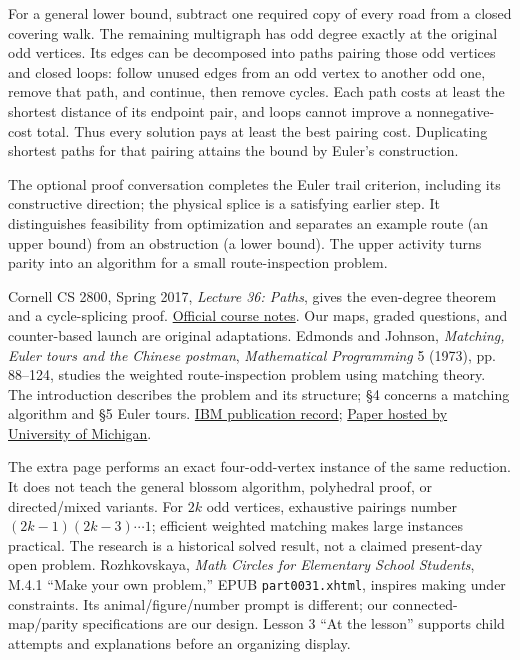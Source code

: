 \documentclass[11pt]{article}
\begin{document}
For a general lower bound, subtract one required copy of every road from a closed covering walk. The remaining multigraph has odd degree exactly at the original odd vertices. Its edges can be decomposed into paths pairing those odd vertices and closed loops: follow unused edges from an odd vertex to another odd one, remove that path, and continue, then remove cycles. Each path costs at least the shortest distance of its endpoint pair, and loops cannot improve a nonnegative-cost total. Thus every solution pays at least the best pairing cost. Duplicating shortest paths for that pairing attains the bound by Euler's construction.

\newpage

The optional proof conversation completes the Euler trail criterion, including its constructive direction; the physical splice is a satisfying earlier step. It distinguishes feasibility from optimization and separates an example route (an upper bound) from an obstruction (a lower bound). The upper activity turns parity into an algorithm for a small route-inspection problem.

Cornell CS 2800, Spring 2017, \emph{Lecture 36: Paths}, gives the even-degree theorem and a cycle-splicing proof. \href{https://www.cs.cornell.edu/courses/cs2800/2017sp/lectures/lec36-graphs2.html}{Official course notes}. Our maps, graded questions, and counter-based launch are original adaptations.
Edmonds and Johnson, \emph{Matching, Euler tours and the Chinese postman}, \emph{Mathematical Programming} 5 (1973), pp. 88--124, studies the weighted route-inspection problem using matching theory. The introduction describes the problem and its structure; \S4 concerns a matching algorithm and \S5 Euler tours. \href{https://research.ibm.com/publications/matching-euler-tours-and-the-chinese-postman}{IBM publication record}; \href{https://web.eecs.umich.edu/~pettie/matching/Edmonds-Johnson-chinese-postman.pdf}{Paper hosted by University of Michigan}.

The extra page performs an exact four-odd-vertex instance of the same reduction. It does not teach the general blossom algorithm, polyhedral proof, or directed/mixed variants. For $2k$ odd vertices, exhaustive pairings number $(2k-1)(2k-3)\cdots1$; efficient weighted matching makes large instances practical. The research is a historical solved result, not a claimed present-day open problem.
Rozhkovskaya, \emph{Math Circles for Elementary School Students}, M.4.1 ``Make your own problem,'' EPUB \texttt{part0031.xhtml}, inspires making under constraints. Its animal/figure/number prompt is different; our connected-map/parity specifications are our design. Lesson 3 ``At the lesson'' supports child attempts and explanations before an organizing display.
\end{document}
